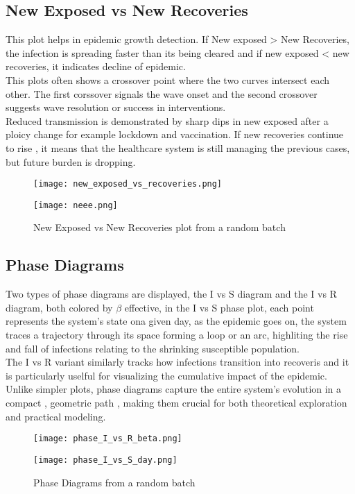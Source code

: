 \documentclass[11pt,a4paper]{article}
\theoremstyle{remark}\newtheorem{remark}{Remark}
\begin{document}
\subsection{New Exposed vs New Recoveries}
This plot helps in epidemic growth detection. If New exposed > New Recoveries, the infection is spreading faster than its being cleared and if new exposed < new recoveries, it indicates decline of epidemic. \\
This plots often shows a crossover point where the two curves intersect each other. The first corssover signals the wave onset and the second crossover suggests wave resolution or success in interventions. \\
Reduced transmission is demonstrated by sharp dips in new exposed after a ploicy change for example lockdown and vaccination. If new recoveries continue to rise , it means that the healthcare system is still managing the previous cases, but future burden is dropping.
\begin{figure}[H]
    \begin{minipage}{0.49\linewidth}
        \flushleft
        \texttt{[image: new\_exposed\_vs\_recoveries.png]}
    \end{minipage}
    \hfill
    \begin{minipage}{0.49\linewidth}
        \flushright
        \texttt{[image: neee.png]}
    \end{minipage}
    
    \caption{New Exposed vs New Recoveries plot from a random batch}
    \label{fig:seir-side-by-side}
\end{figure}
\subsection{Phase Diagrams}
Two types of phase diagrams are displayed, the I vs S diagram and the I vs R diagram, both colored by $\beta$ effective, in the I vs S phase plot, each point represents the system's state ona  given day, as the epidemic goes on, the system traces a trajectory through its space forming a loop or an arc, highliting the rise and fall of infections relating to the shrinking susceptible population.\\
The I vs R variant similarly tracks how infections transition into recoveris and it is particularly uselful for visualizing the cumulative impact of the epidemic. Unlike simpler plots, phase diagrams capture the entire system's evolution in a compact , geometric path , making them crucial for both theoretical exploration and practical modeling.
\begin{figure}[H]
    \begin{minipage}{0.49\linewidth}
        \flushleft
        \texttt{[image: phase\_I\_vs\_R\_beta.png]}
    \end{minipage}
    \hfill
    \begin{minipage}{0.49\linewidth}
        \flushright
        \texttt{[image: phase\_I\_vs\_S\_day.png]}
    \end{minipage}
    
    \caption{Phase Diagrams from a random batch}
    \label{fig:seir-side-by-side}
\end{figure}
\end{document}
